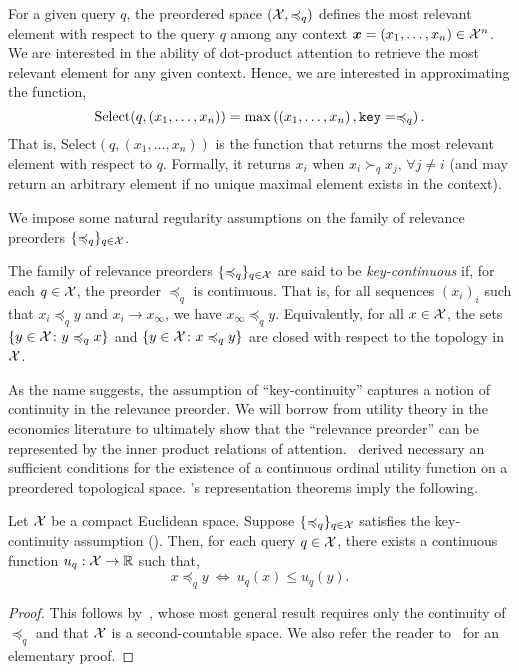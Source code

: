 For a given query $q$, the preordered space $({\mathcal{X}}, \preccurlyeq_q)$ defines the most relevant element with respect to the query $q$ among any context $\bm{x} = (x_1, \ldots, x_n) \in {\mathcal{X}}^n$. We are interested in the ability of dot-product attention to retrieve the most relevant element for any given context. Hence, we are interested in approximating the function,
\begin{equation}\label{eq:def_select}
    \mathrm{Select}(q, (x_1, \ldots, x_n)) = \max\paren{\paren{x_1, \ldots, x_n}, \mathtt{key}=\preceq_q}.
\end{equation}
That is, $\mathrm{Select}(q, (x_1, \ldots, x_n))$ is the function that returns the most relevant element with respect to $q$. Formally, it returns $x_i$ when $x_i \succ_q x_j, \, \forall j \neq i$ (and may return an arbitrary element if no unique maximal element exists in the context).

We impose some natural regularity assumptions on the family of relevance preorders $\{\preccurlyeq_q\}_{q \in {\mathcal{X}}}$.
\begin{assumption}\label{ass:key_cts}
    The family of relevance preorders $\{\preccurlyeq_q\}_{q \in {\mathcal{X}}}$ are said to be \textit{key-continuous} if, for each $q \in {\mathcal{X}}$, the preorder $\preceq_q$ is continuous. That is, for all sequences $(x_i)_i$ such that $x_i \preceq_q y$ and $x_i \to x_\infty$, we have $x_\infty \preceq_q y$. Equivalently, for all $x \in {\mathcal{X}}$, the sets $\{y \in {\mathcal{X}} \colon y \preccurlyeq_q x\}$ and $\{y \in {\mathcal{X}} \colon x \preccurlyeq_q y\}$ are closed with respect to the topology in ${\mathcal{X}}$.
\end{assumption}

As the name suggests, the assumption of ``key-continuity'' captures a notion of continuity in the relevance preorder. We will borrow from utility theory in the economics literature to ultimately show that the ``relevance preorder'' can be represented by the inner product relations of attention.~\citet{debreuRepresentationPreferenceOrdering1954} derived necessary an sufficient conditions for the existence of a continuous ordinal utility function on a preordered topological space. 's representation theorems imply the following.

\begin{theorem*}
    Let ${\mathcal{X}}$ be a compact Euclidean space. Suppose $\{\preccurlyeq_q\}_{q \in {\mathcal{X}}}$ satisfies the key-continuity assumption (). Then, for each query $q \in {\mathcal{X}}$, there exists a continuous function $u_q: {\mathcal{X}} \to \mathbb{R}$ such that,
    \begin{equation*}
        x \preceq_q y \ \iff \ u_q(x) \leq u_q(y).
    \end{equation*}
\end{theorem*}
\begin{proof}
    This follows by~\parencite{debreuRepresentationPreferenceOrdering1954}, whose most general result requires only the continuity of $\preceq_q$ and that ${\mathcal{X}}$ is a second-countable space. We also refer the reader to~\parencite{jaffrayExistenceContinuousUtility1975} for an elementary proof.
\end{proof}

